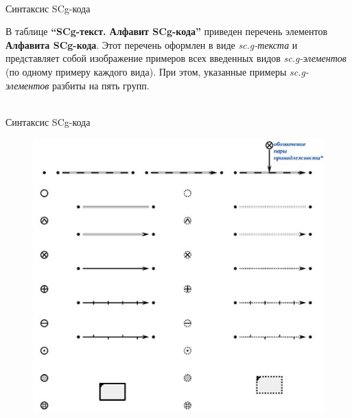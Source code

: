 \begin{frame}{\\Синтаксис SCg-кода}
	\topline
	\justifying
	\begin{SCn}
	\end{SCn}
	В таблице \textbf{“SCg-текст. Алфавит SCg-кода”} приведен перечень элементов \textbf{Алфавита SCg-кода}. Этот перечень оформлен в виде \textit{sc.g-текста} и представляет собой изображение примеров всех введенных видов \textit{sc.g-элементов} (по одному примеру каждого вида). При этом, указанные примеры \textit{sc.g-элементов} разбиты на пять групп.
\end{frame}
\begin{frame}{\\Синтаксис SCg-кода}
	\topline
	\justifying
	\vspace*{\fill}
	\begin{figure}[H]
		\includegraphics[scale=0.55]{./figures/external_langs/alphabet_scg_code_part1.png}
	\end{figure}
\end{frame}

